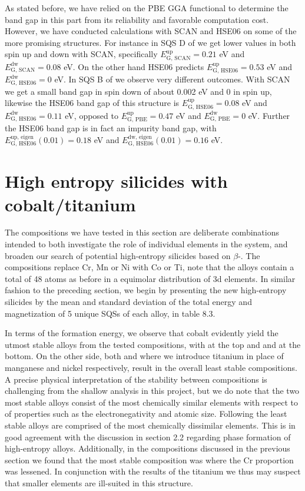 As stated before, we have relied on the PBE GGA functional to determine the band gap in this part from its reliability and favorable computation cost. However, we have conducted calculations with SCAN and HSE06 on some of the more promising structures. For instance in SQS D of  we get lower values in both spin up and down with SCAN, specifically $E_\text{G, SCAN} ^\text{up}= 0.21$ eV and $E_\text{G, SCAN} ^\text{dw} = 0.08$ eV. On the other hand HSE06 predicts $E_\text{G, HSE06} ^\text{up} = 0.53$ eV and $E_\text{G, HSE06} ^\text{dw} = 0$ eV. In SQS B of  we observe very different outcomes. With SCAN we get a small band gap in spin down of about 0.002 eV and 0 in spin up, likewise the HSE06 band gap of this structure is $E_\text{G, HSE06} ^\text{up} = 0.08$ eV and $E_\text{G, HSE06} ^\text{dw} = 0.11$ eV, opposed to $E_\text{G, PBE} ^\text{up} = 0.47$ eV and $E_\text{G, PBE} ^\text{dw} = 0$ eV. Further the HSE06 band gap is in fact an impurity band gap, with $E_\text{G, HSE06} ^\text{up, eigen}(0.01) = 0.18$ eV and $E_\text{G, HSE06} ^\text{dw, eigen}(0.01) = 0.16$ eV.

\section{High entropy silicides with cobalt/titanium}

The compositions we have tested in this section are deliberate combinations intended to both investigate the role of individual elements in the  system, and broaden our search of potential high-entropy silicides based on $\beta$-. The compositions replace Cr, Mn or Ni with Co or Ti, note that the alloys contain a total of 48 atoms as before in a equimolar distribution of 3d elements. In similar fashion to the preceding section, we begin by presenting the new high-entropy silicides by the mean and standard deviation of the total energy and magnetization of 5 unique SQSs of each alloy, in table 8.3.

In terms of the formation energy, we observe that cobalt evidently yield the utmost stable alloys from the tested compositions, with  at the top and and  at the bottom. On the other side, both  and  where we introduce titanium in place of manganese and nickel respectively, result in the overall least stable compositions. A precise physical interpretation of the stability between compositions is challenging from the shallow analysis in this project, but we do note that the two most stable alloys consist of the most chemically similar elements with respect to of properties such as the electronegativity and atomic size. Following the least stable alloys are comprised of the most chemically dissimilar elements. This is in good agreement with the discussion in section 2.2 regarding phase formation of high-entropy alloys. Additionally, in the compositions discussed in the previous section we found that the most stable composition was  where the Cr proportion was lessened. In conjunction with the results of the titanium we thus may suspect that smaller elements are ill-suited in this structure.   

